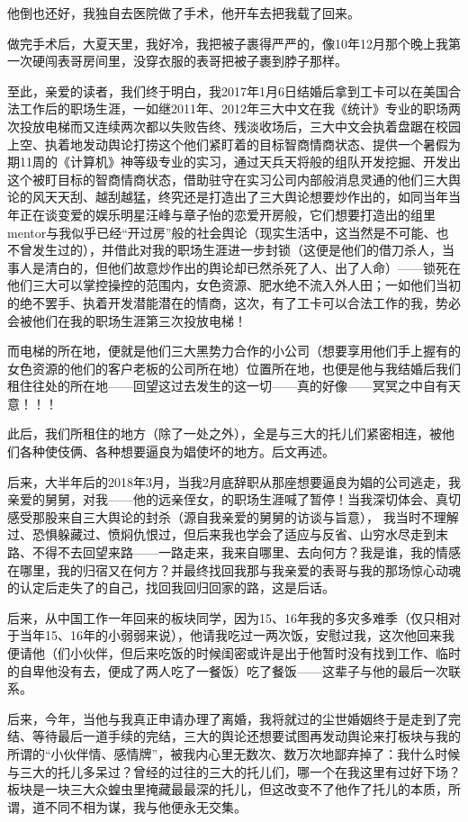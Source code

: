 \documentclass[9pt, b5paper]{article}
\begin{document}
他倒也还好，我独自去医院做了手术，他开车去把我载了回来。

做完手术后，大夏天里，我好冷，我把被子裹得严严的，像10年12月那个晚上我第一次硬闯表哥房间里，没穿衣服的表哥把被子裹到脖子那样。

至此，亲爱的读者，我们终于明白，我2017年1月6日结婚后拿到工卡可以在美国合法工作后的职场生涯，一如继2011年、2012年三大中文在我《统计》专业的职场两次投放电梯而又连续两次都以失败告终、残淡收场后，三大中文会执着盘踞在校园上空、执着地发动舆论打捞这个他们紧盯着的目标智商情商状态、提供一个暑假为期11周的《计算机》神等级专业的实习，通过天兵天将般的组队开发挖掘、开发出这个被盯目标的智商情商状态，借助驻守在实习公司内部般消息灵通的他们三大舆论的风天天刮、越刮越猛，终究还是打造出了三大舆论想要炒作出的，如同当年当年正在谈变爱的娱乐明星汪峰与章子怡的恋爱开房般，它们想要打造出的组里mentor与我似乎已经“开过房”般的社会舆论（现实生活中，这当然是不可能、也不曾发生过的），并借此对我的职场生涯进一步封锁（这便是他们的借刀杀人，当事人是清白的，但他们故意炒作出的舆论却已然杀死了人、出了人命）——锁死在他们三大可以掌控操控的范围内，女色资源、肥水绝不流入外人田；一如他们当初的绝不罢手、执着开发潜能潜在的情商，这次，有了工卡可以合法工作的我，势必会被他们在我的职场生涯第三次投放电梯！

而电梯的所在地，便就是他们三大黑势力合作的小公司（想要享用他们手上握有的女色资源的他们的客户老板的公司所在地）位置所在地，也便是他与我结婚后我们租住往处的所在地——回望这过去发生的这一切——真的好像——冥冥之中自有天意！！！

此后，我们所租住的地方（除了一处之外），全是与三大的托儿们紧密相连，被他们各种使伎俩、各种想要逼良为娼使坏的地方。后文再述。

后来，大半年后的2018年3月，当我2月底辞职从那座想要逼良为娼的公司逃走，我亲爱的舅舅，对我——他的远亲侄女，的职场生涯喊了暂停！当我深切体会、真切感受那股来自三大舆论的封杀（源自我亲爱的舅舅的访谈与旨意），
我当时不理解过、恐惧躲藏过、愤焖仇恨过，但后来我也学会了适应与反省、山穷水尽走到末路、不得不去回望来路——一路走来，我来自哪里、去向何方？我是谁，我的情感在哪里，我的归宿又在何方？并最终找回我那与我亲爱的表哥与我的那场惊心动魂的认定后走失了的自己，找回我回归回家的路，这是后话。

后来，从中国工作一年回来的板块同学，因为15、16年我的多灾多难季（仅只相对于当年15、16年的小弱弱来说），他请我吃过一两次饭，安慰过我，这次他回来我便请他（们小伙伴，但后来吃饭的时候闺密或许是出于他暂时没有找到工作、临时的自卑他没有去，便成了两人吃了一餐饭）吃了餐饭——这辈子与他的最后一次联系。

后来，今年，当他与我真正申请办理了离婚，我将就过的尘世婚姻终于是走到了完结、等待最后一道手续的完结，三大的舆论还想要试图再发动舆论来打板块与我的所谓的“小伙伴情、感情牌”，被我内心里无数次、数万次地鄙弃掉了：我什么时候与三大的托儿多呆过？曾经的过往的三大的托儿们，哪一个在我这里有过好下场？板块是一块三大众蝗虫里掩藏最最深的托儿，但这改变不了他作了托儿的本质，所谓，道不同不相为谋，我与他便永无交集。
\end{document}
